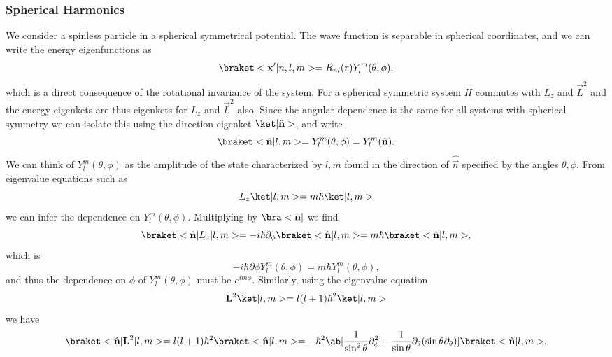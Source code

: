 \subsubsection{Spherical Harmonics}
We consider a spinless particle in a spherical symmetrical potential. The wave function is separable in spherical coordinates, and we can write the energy eigenfunctions as 
\begin{equation}
    \bk{\vec{x}'}{n,l,m} = R_{nl}(r) Y_l^m(\theta, \phi),
\end{equation}
which is a direct consequence of the rotational invariance of the system. For a spherical symmetric system $H$ commutes with $L_z$ and $\vec{L}^2$ and the energy eigenkets are thus eigenkets for $L_z$ and $\vec{L}^2$ also. Since the angular dependence is the same for all systems with spherical symmetry we can isolate this using the direction eigenket $\k{\hat{\vec{n}}}$, and write
\begin{equation}
    \bk{\hat{\vec{n}}}{l,m} = Y_l^m(\theta,\phi) = Y_l^m (\hat{\vec{n}}).
\end{equation}
We can think of $Y_l^m(\theta,\phi)$ as the amplitude of the state characterized by $l,m$ found in the direction of $\hat{\vec{n}}$ specified by the angles $\theta,\phi$. From eigenvalue equations such as 
\begin{equation}
    L_z\k{l,m} = m\hbar \k{l,m}
\end{equation}
we can infer the dependence on $Y_l^m(\theta, \phi)$. Multiplying by $\b{\hat{\vec{n}}}$ we find
\begin{equation}
    \bkop{\hat{\vec{n}}}{L_z}{l,m} = -i\hbar \partial_\phi \bk{\hat{\vec{n}}}{l,m} = m\hbar \bk{\hat{\vec{n}}}{l,m},
\end{equation}
which is
\begin{equation}
    -i\hbar \partial\phi Y_l^m(\theta, \phi) = m\hbar Y_l^m(\theta,\phi),
\end{equation}
and thus the dependence on $\phi$ of $Y_l^m(\theta,\phi)$ must be $e^{im\phi}$. Similarly, using the eigenvalue equation
\begin{equation}
    \vec{L}^2 \k{l,m} = l(l+1)\hbar^2\k{l,m}
\end{equation}
we have
\begin{equation}
    \bkop{\hat{\vec{n}}}{\vec{L}^2}{l,m} = l(l+1)\hbar^2 \bk{\hat{\vec{n}}}{l,m} = -\hbar^2\ab[ \frac{1}{\sin^2\theta} \partial_\phi^2 + \frac{1}{\sin\theta}\partial_\theta (\sin\theta \partial_\theta)] \bk{\hat{\vec{n}}}{l,m},
\end{equation}
